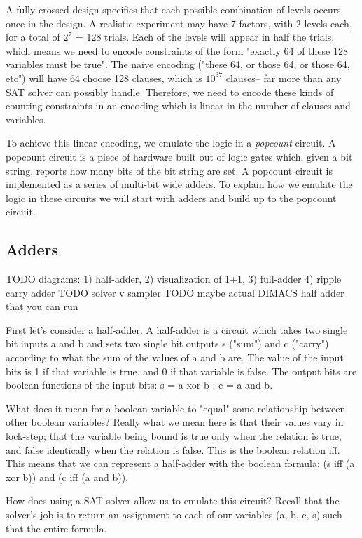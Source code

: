 A fully crossed design specifies that each possible combination of levels occurs once in the design. A realistic experiment may have 7 factors, with 2 levels each, for a total of $2^7$ = 128 trials. Each of the levels will appear in half the trials, which means we need to encode constraints of the form "exactly 64 of these 128 variables must be true". The naive encoding ("these 64, or those 64, or those 64, etc") will have 64 choose 128 clauses, which is $10^{37}$ clauses-- far more than any SAT solver can possibly handle. Therefore, we need to encode these kinds of counting constraints in an encoding which is linear in the number of clauses and variables.

To achieve this linear encoding, we emulate the logic in a \emph{popcount} circuit. A popcount circuit is a piece of hardware built out of logic gates which, given a bit string, reports how many bits of the bit string are set. A popcount circuit is implemented as a series of multi-bit wide adders. To explain how we emulate the logic in these circuits we will start with adders and build up to the popcount circuit.

\subsection{Adders}

TODO diagrams: 1) half-adder, 2) visualization of 1+1, 3) full-adder 4) ripple carry adder
TODO solver v sampler
TODO maybe actual DIMACS half adder that you can run

First let's consider a half-adder. A half-adder is a circuit which takes two single bit inputs a and b and sets two single bit outputs s ("sum") and c ("carry") according to what the sum of the values of a and b are. The value of the input bits is 1 if that variable is true, and 0 if that variable is false. The output bits are boolean functions of the input bits: s = a xor b ; c = a and b.

What does it mean for a boolean variable to "equal" some relationship between other boolean variables? Really what we mean here is that their values vary in lock-step; that the variable being bound is true only when the relation is true, and false identically when the relation is false. This is the boolean relation iff. This means that we can represent a half-adder with the boolean formula:
(s iff (a xor b)) and (c iff (a and b)).

How does using a SAT solver allow us to emulate this circuit? Recall that the solver's job is to return an assignment to each of our variables (a, b, c, s) such that the entire formula.


